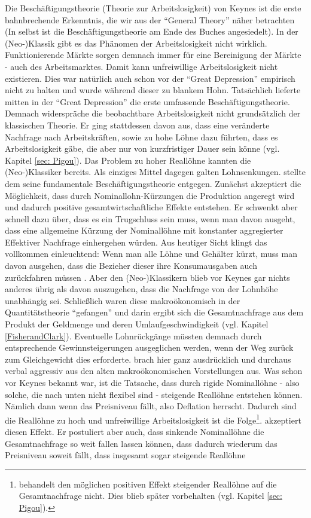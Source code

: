 Die Beschäftigungstheorie (Theorie zur Arbeitslosigkeit) von Keynes ist die erste bahnbrechende Erkenntnis, die wir aus der "`General Theory"' näher betrachten (In \textcite{Keynes1936} selbst ist die Beschäftigungstheorie am Ende des Buches angesiedelt). In der (Neo-)Klassik gibt es das Phänomen der Arbeitslosigkeit nicht wirklich. Funktionierende Märkte sorgen demnach immer für eine Bereinigung der Märkte - auch des Arbeitsmarktes. Damit kann unfreiwillige Arbeitslosigkeit nicht existieren. Dies war natürlich auch schon vor der "`Great Depression"' empirisch nicht zu halten und wurde während dieser zu blankem Hohn. Tatsächlich lieferte \textcite{Pigou1933} mitten in der "`Great Depression"' die erste umfassende Beschäftigungstheorie. Demnach widerspräche die beobachtbare Arbeitslosigkeit nicht grundsätzlich der klassischen Theorie. Er ging stattdessen davon aus, dass eine veränderte Nachfrage nach Arbeitskräften, sowie zu hohe Löhne dazu führten, dass es Arbeitslosigkeit gäbe, die aber nur von kurzfristiger Dauer sein könne (vgl. Kapitel \ref{sec: Pigou}). Das Problem zu hoher Reallöhne kannten die (Neo-)Klassiker bereits. Als einziges Mittel dagegen galten Lohnsenkungen. \textcite{Keynes1936} stellte dem seine fundamentale Beschäftigungstheorie entgegen. Zunächst akzeptiert \textcite[S. 258f]{Keynes1936} die Möglichkeit, dass durch Nominallohn-Kürzungen die Produktion angeregt wird und dadurch positive gesamtwirtschaftliche Effekte entstehen. Er schwenkt aber schnell dazu über, dass es ein Trugschluss sein muss, wenn man davon ausgeht, dass eine allgemeine Kürzung der Nominallöhne mit konstanter aggregierter Effektiver Nachfrage einhergehen würden. Aus heutiger Sicht klingt das vollkommen einleuchtend: Wenn man alle Löhne und Gehälter kürzt, muss man davon ausgehen, dass die Bezieher dieser ihre Konsumausgaben auch zurückfahren müssen \parencite[S. 269]{Keynes1936}. Aber den (Neo-)Klassikern blieb vor Keynes gar nichts anderes übrig als davon auszugehen, dass die Nachfrage von der Lohnhöhe unabhängig sei. Schließlich waren diese makroökonomisch in der Quantitätstheorie "`gefangen"' und darin ergibt sich die Gesamtnachfrage aus dem Produkt der Geldmenge und deren Umlaufgeschwindigkeit (vgl. Kapitel \ref{FisherandClark}). Eventuelle Lohnrückgänge müssten demnach durch entsprechende Gewinnsteigerungen ausgeglichen werden, wenn der Weg zurück zum Gleichgewicht dies erforderte. \textcite{Keynes1936} brach hier ganz ausdrücklich und durchaus verbal aggressiv aus den alten makroökonomischen Vorstellungen aus. Was schon vor Keynes bekannt war, ist die Tatsache, dass durch rigide Nominallöhne - also solche, die nach unten nicht flexibel sind - steigende Reallöhne entstehen können. Nämlich dann wenn das Preisniveau fällt, also Deflation herrscht. Dadurch sind die Reallöhne zu hoch und unfreiwillige Arbeitslosigkeit ist die Folge\footnote{\textcite{Keynes1936} behandelt den möglichen positiven Effekt steigender Reallöhne auf die Gesamtnachfrage nicht. Dies blieb später \textcite{Pigou1943} vorbehalten (vgl. Kapitel \ref{sec: Pigou}).}. \textcite{Keynes1936} akzeptiert diesen Effekt. Er postuliert aber auch, dass sinkende Nominallöhne die Gesamtnachfrage so weit fallen lassen können, dass dadurch wiederum das Preisniveau soweit fällt, dass insgesamt sogar steigende Reallöhne 